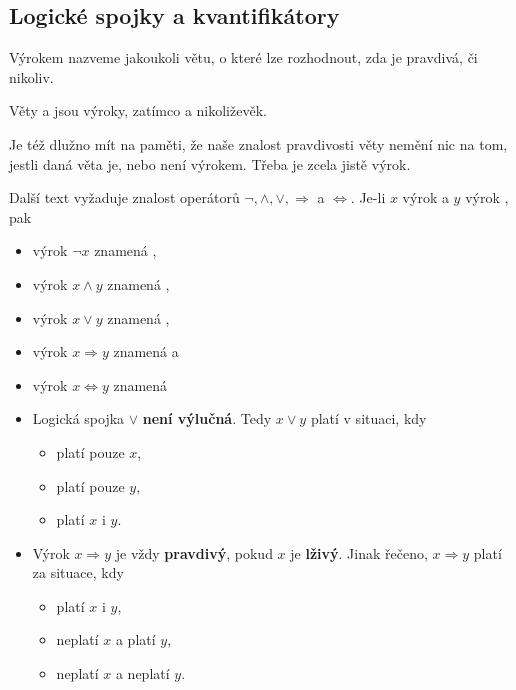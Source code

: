\subsection{Logické spojky a kvantifikátory}
\label{ssec:logicke-spojky-a-kvantifikatory}

\begin{definition}[Výrok]
 Výrokem nazveme jakoukoli větu, o které lze rozhodnout, zda je pravdivá, či
 nikoliv.
\end{definition}

\begin{example}
 Věty  a  jsou výroky, zatímco  a  nikoliževěk.

 Je též dlužno mít na paměti, že naše znalost pravdivosti věty nemění nic na
 tom, jestli daná věta je, nebo není výrokem. Třeba  je zcela jistě výrok.
\end{example}

Další text vyžaduje znalost operátorů $\neg, \wedge, \vee, \Rightarrow$ a
$\Leftrightarrow$. Je-li $x$ výrok  a $y$ výrok , pak
\begin{itemize}
 \item výrok $\neg x$ znamená ,
 \item výrok $x \wedge y$ znamená ,
 \item výrok $x \vee y$ znamená ,
 \item výrok $x \Rightarrow y$ znamená  a
 \item výrok $x \Leftrightarrow y$ znamená 
\end{itemize}

\begin{warning}\hfill
 \vspace*{-\parskip}
 \begin{itemize}
  \item Logická spojka $ \vee $ \textbf{není výlučná}. Tedy $x \vee y$ platí
   v situaci, kdy
   \begin{itemize}
    \item platí pouze $x$,
    \item platí pouze $y$,
    \item platí $x$ i $y$.
   \end{itemize}
  \item Výrok $x \Rightarrow y$ je vždy \textbf{pravdivý}, pokud $x$ je
   \textbf{lživý}. Jinak řečeno, $x \Rightarrow y$ platí za situace, kdy
   \begin{itemize}
    \item platí $x$ i $y$,
    \item neplatí $x$ a platí $y$,
    \item neplatí $x$ a neplatí $y$.
   \end{itemize}
 \end{itemize}
\end{warning}

